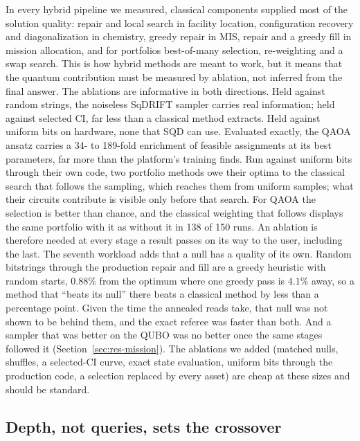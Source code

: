 \documentclass[11pt,a4paper]{article}
\begin{document}
In every hybrid pipeline we measured, classical components supplied most of
the solution quality: repair and local search in facility location,
configuration recovery and diagonalization in chemistry, greedy repair in
MIS, repair and a greedy fill in mission allocation, and for portfolios
best-of-many selection, re-weighting and a swap search. This is how hybrid methods are meant to work, but it means that the
quantum contribution must be measured by ablation, not inferred from the
final answer. The ablations are informative in both directions. Held against
random strings, the noiseless SqDRIFT sampler carries real information;
held against selected CI, far less than a classical method extracts. Held
against uniform bits on hardware, none that SQD can use. Evaluated exactly,
the QAOA ansatz carries a 34- to 189-fold
enrichment of feasible assignments at its best parameters, far more than
the platform's training finds. Run
against uniform bits through their own code, two portfolio methods owe
their optima to the classical search that follows the sampling, which
reaches them from uniform samples; what their circuits contribute is
visible only before that search. For QAOA the selection is better than
chance, and the classical weighting that follows displays the same
portfolio with it as without it in 138 of 150 runs. An ablation is therefore
needed at every stage a result passes on its way to the user, including the
last. The seventh workload adds that a null has a quality of its own.
Random bitstrings through the production repair and fill are a greedy
heuristic with random starts, $0.88\%$ from the optimum where one greedy
pass is $4.1\%$ away, so a method that ``beats its null'' there beats a
classical method by less than a percentage point. Given the time the
annealed reads take, that null was not shown to be behind them, and the
exact referee was faster than both. And a sampler that was
better on the QUBO was no better once the same stages followed it
(Section~\ref{sec:res-mission}). The
ablations we added (matched nulls, shuffles, a selected-CI curve, exact
state evaluation, uniform bits through the production code, a selection
replaced by every asset) are cheap at
these sizes and should be standard.

\subsection{Depth, not queries, sets the crossover}
\end{document}
